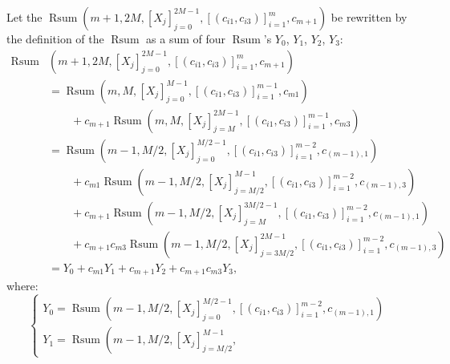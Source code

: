 \documentclass{mathcryptology} %
\DeclareMathOperator{\Rsum}{Rsum}
\theoremstyle{title}
\theoremstyle{titleof}
\renewenvironment{proof}{\noindent{\bfseries Proof:} }{}
\begin{document}
\begin{proof}
        Let the $\Rsum\left(m+1, 2M, {\left[ X_{j}\right]}_{j=0}^{2M-1}, {\left[\left(c_{i1}, c_{i3}\right)\right]}_{i=1}^m, c_{m+1}\right)$ be rewritten by the definition of the $\Rsum$ as a sum of four $\Rsum$'s $Y_{0}$, $Y_{1}$, $Y_{2}$, $Y_{3}$:
        \begin{align*}
            \Rsum & \left( m+1, 2M, {\left[X_{j}\right]}_{j=0}^{2M-1},
            {\left[ \left(c_{i1}, c_{i3}\right)\right]}_{i=1}^m,
            c_{m+1}\right)\\ & =
            \Rsum \left( m, M, {\left[X_{j}\right]}_{j=0}^{M-1},
            {\left[ \left(c_{i1}, c_{i3}\right)\right]}_{i=1}^{m-1},
            c_{m1}\right)\\
            &\qquad +
            c_{m+1}
            \Rsum \left( m, M, {\left[X_{j}\right]}_{j=M}^{2M-1},
            {\left[\left(c_{i1}, c_{i3}\right)\right]}_{i=1}^{m-1},
            c_{m3}\right) \\
            & =
            \Rsum \left( m-1, M/2, {\left[X_{j}\right]}_{j=0}^{M/2-1},
            {\left[\left(c_{i1}, c_{i3}\right)\right]}_{i=1}^{m-2},
            c_{\left(m-1\right),1}\right) \\
            &\qquad +
            c_{m1}
            \Rsum \left( m-1, M/2, {\left[X_{j}\right]}_{j=M/2}^{M-1},
            {\left[\left(c_{i1}, c_{i3}\right)\right]}_{i=1}^{m-2},
            c_{\left(m-1\right),3}\right) \\
            &\qquad +
            c_{m+1}
            \Rsum \left( m-1, M/2, {\left[X_{j}\right]}_{j=M}^{3M/2-1},
            {\left[\left(c_{i1}, c_{i3}\right)\right]}_{i=1}^{m-2},
            c_{\left(m-1\right),1}\right) \\
            &\qquad +
            c_{m+1} c_{m3}
            \Rsum \left( m-1, M/2, {\left[X_{j}\right]}_{j=3M/2}^{2M-1},
            {\left[\left(c_{i1}, c_{i3}\right)\right]}_{i=1}^{m-2},
            c_{\left(m-1\right),3}\right) \\
            & =
            Y_{0} + c_{m1} Y_{1} + c_{m+1}  Y_{2} + c_{m+1} c_{m3} Y_{3},
        \end{align*}
        where:
        \begin{equation*}
        \left\{\begin{array}{l}
            Y_{0} = \Rsum\left(m-1, M/2, {\left[X_{j}\right]}_{j=0}^{M/2-1},
                {\left[\left(c_{i1}, c_{i3}\right)\right]}_{i=1}^{m-2},
                c_{\left(m-1\right),1}\right)\\
            Y_{1} = \Rsum\left(m-1, M/2, {\left[X_{j}\right]}_{j=M/2}^{M-1},

\end{array}
\end{equation*}
\end{proof}
\end{document}
